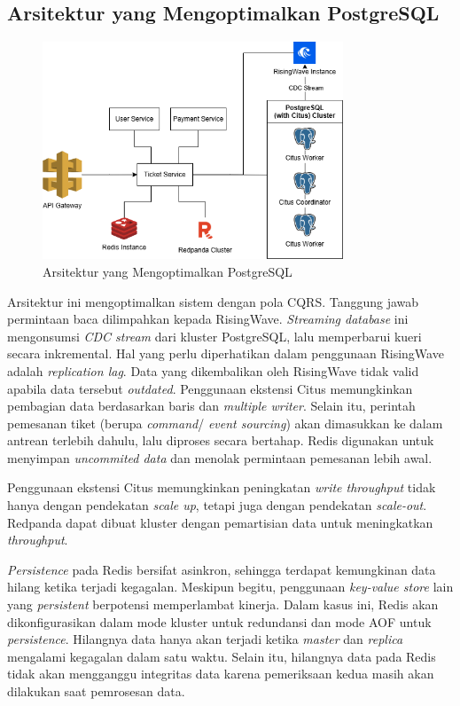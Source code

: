 \subsection{Arsitektur yang Mengoptimalkan PostgreSQL}

\begin{figure}[htbp]
    \centering
    \includegraphics[width=0.8\textwidth]{resources/appendix/architecture-optimized.png}
    \caption{Arsitektur yang Mengoptimalkan PostgreSQL}
    \label{fig:optimized-architecture}
\end{figure}

Arsitektur ini mengoptimalkan sistem dengan pola CQRS. Tanggung jawab permintaan baca dilimpahkan kepada RisingWave. \textit{Streaming database} ini mengonsumsi \textit{CDC stream} dari kluster PostgreSQL, lalu memperbarui kueri secara inkremental. Hal yang perlu diperhatikan dalam penggunaan RisingWave adalah \textit{replication lag}. Data yang dikembalikan oleh RisingWave tidak valid apabila data tersebut \textit{outdated}. Penggunaan ekstensi Citus memungkinkan pembagian data berdasarkan baris dan \textit{multiple writer}. Selain itu, perintah pemesanan tiket (berupa \textit{command}/ \textit{event sourcing}) akan dimasukkan ke dalam antrean terlebih dahulu, lalu diproses secara bertahap. Redis digunakan untuk menyimpan \textit{uncommited data} dan menolak permintaan pemesanan lebih awal.

Penggunaan ekstensi Citus memungkinkan peningkatan \textit{write throughput} tidak hanya dengan pendekatan \textit{scale up}, tetapi juga dengan pendekatan \textit{scale-out}. Redpanda dapat dibuat kluster dengan pemartisian data untuk meningkatkan \textit{throughput}.

\textit{Persistence} pada Redis bersifat asinkron, sehingga terdapat kemungkinan data hilang ketika terjadi kegagalan. Meskipun begitu, penggunaan \textit{key-value store} lain yang \textit{persistent} berpotensi memperlambat kinerja. Dalam kasus ini, Redis akan dikonfigurasikan dalam mode kluster untuk redundansi dan mode AOF untuk \textit{persistence}. Hilangnya data hanya akan terjadi ketika \textit{master} dan \textit{replica} mengalami kegagalan dalam satu waktu. Selain itu, hilangnya data pada Redis tidak akan mengganggu integritas data karena pemeriksaan kedua masih akan dilakukan saat pemrosesan data.

